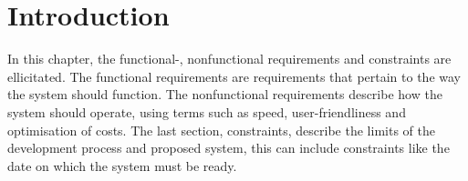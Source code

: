 \section{Introduction}
In this chapter, the functional-, nonfunctional requirements and constraints are ellicitated. The functional requirements are requirements that pertain to the way the system should function. The nonfunctional requirements describe how the system should operate, using terms such as speed, user-friendliness and optimisation of costs. The last section, constraints, describe the limits of the development process and proposed system, this can include constraints like the date on which the system must be ready.